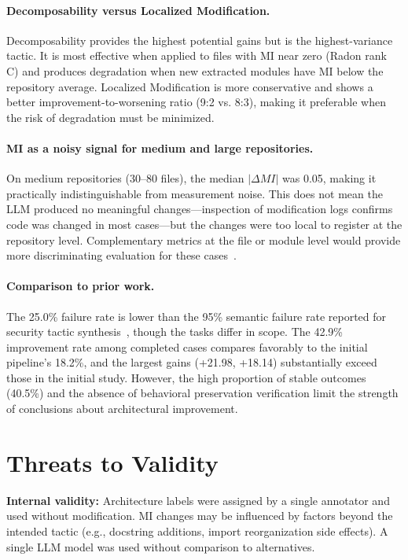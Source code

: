 \documentclass[sigconf,review,anonymous]{acmart}
\begin{document}
\paragraph{Decomposability versus Localized Modification.} Decomposability provides the highest potential gains but is the highest-variance tactic. It is most effective when applied to files with MI near zero (Radon rank C) and produces degradation when new extracted modules have MI below the repository average. Localized Modification is more conservative and shows a better improvement-to-worsening ratio (9:2 vs. 8:3), making it preferable when the risk of degradation must be minimized.

\paragraph{MI as a noisy signal for medium and large repositories.} On medium repositories (30--80 files), the median $|\Delta MI|$ was 0.05, making it practically indistinguishable from measurement noise. This does not mean the LLM produced no meaningful changes---inspection of modification logs confirms code was changed in most cases---but the changes were too local to register at the repository level. Complementary metrics at the file or module level would provide more discriminating evaluation for these cases~\cite{lenarduzzi2023critical}.

\paragraph{Comparison to prior work.} The 25.0\% failure rate is lower than the 95\% semantic failure rate reported for security tactic synthesis~\cite{shokri2024ipsynth}, though the tasks differ in scope. The 42.9\% improvement rate among completed cases compares favorably to the initial pipeline's 18.2\%, and the largest gains (+21.98, +18.14) substantially exceed those in the initial study. However, the high proportion of stable outcomes (40.5\%) and the absence of behavioral preservation verification limit the strength of conclusions about architectural improvement.

\section{Threats to Validity}

\textbf{Internal validity:} Architecture labels were assigned by a single annotator and used without modification. MI changes may be influenced by factors beyond the intended tactic (e.g., docstring additions, import reorganization side effects). A single LLM model was used without comparison to alternatives.
\end{document}
